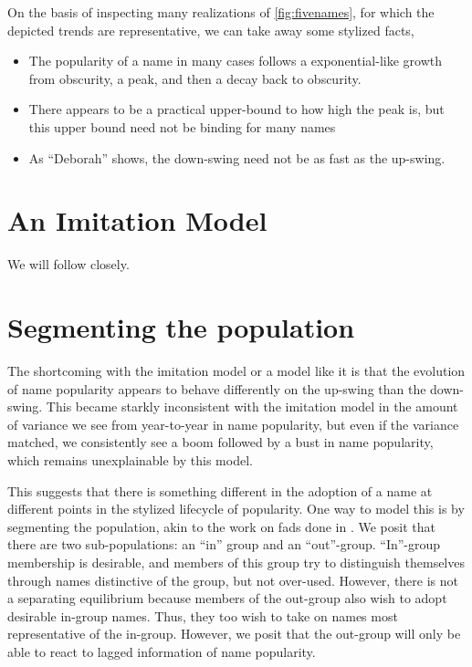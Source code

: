 \documentclass[a4paper]{article}
\begin{document}
On the basis of inspecting many realizations of \cref{fig:fivenames}, for which
the depicted trends are representative, we can take away some stylized facts,

\begin{itemize}
\item The popularity of a name in many cases follows a exponential-like growth
from obscurity, a peak, and then a decay back to obscurity.
\item There appears to be a practical upper-bound to how high the peak is, but
this upper bound need not be binding for many names
\item As ``Deborah'' shows, the down-swing need not be as fast as the up-swing.
\end{itemize}

\section{An Imitation Model}

We will follow \cite{hahn2003drift} closely.

\section{Segmenting the population}

The shortcoming with the imitation model or a model like it is that the
evolution of name popularity appears to behave differently on the up-swing than
the down-swing. This became starkly inconsistent with the imitation model in the
amount of variance we see from year-to-year in name popularity, but even if the
variance matched, we consistently see a boom followed by a bust in name
popularity, which remains unexplainable by this model.

This suggests that there is something different in the adoption of a name at
different points in the stylized lifecycle of popularity. One way to model this
is by segmenting the population, akin to the work on fads done in
\cite{bergman2012fad}. We posit that there are two sub-populations: an ``in''
group and an ``out''-group. ``In''-group membership is desirable, and members of
this group try to distinguish themselves through names distinctive of the group,
but not over-used. However, there is not a separating equilibrium because
members of the out-group also wish to adopt desirable in-group names. Thus, they
too wish to take on names most representative of the in-group. However, we posit
that the out-group will only be able to react to lagged information of name
popularity.
\end{document}
